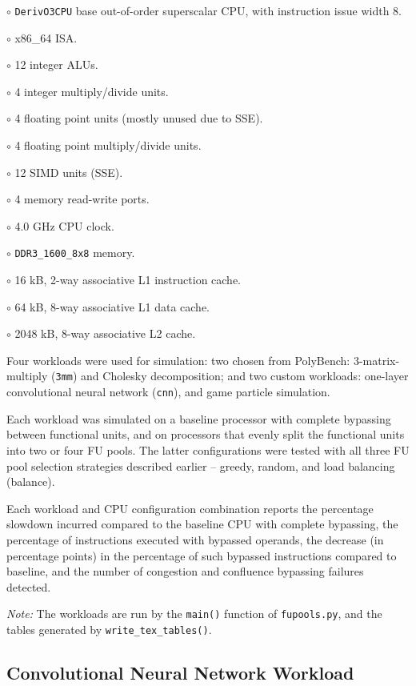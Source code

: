 \documentclass[11pt]{article}
\begin{document}
\( \circ \) \texttt{DerivO3CPU} base out-of-order superscalar CPU,
with instruction issue width 8.

\( \circ \) x86\_64 ISA.

\( \circ \) 12 integer ALUs.

\( \circ \) 4 integer multiply/divide units.

\( \circ \) 4 floating point units (mostly unused due to SSE).

\( \circ \) 4 floating point multiply/divide units.

\( \circ \) 12 SIMD units (SSE).

\( \circ \) 4 memory read-write ports.

\( \circ \) 4.0 GHz CPU clock.

\( \circ \) \texttt{DDR3\_1600\_8x8} memory.

\( \circ \) 16 kB, 2-way associative L1 instruction cache.

\( \circ \) 64 kB, 8-way associative L1 data cache.

\( \circ \) 2048 kB, 8-way associative L2 cache.

Four workloads were used for simulation: two chosen from PolyBench:
3-matrix-multiply (\texttt{3mm}) and Cholesky decomposition; and two
custom workloads: one-layer convolutional neural network
(\texttt{cnn}), and game particle simulation.

Each workload was simulated on a baseline processor with complete
bypassing between functional units, and on processors that evenly
split the functional units into two or four FU pools. The latter
configurations were tested with all three FU pool selection strategies
described earlier -- greedy, random, and load balancing (balance).

Each workload and CPU configuration combination reports the percentage
slowdown incurred compared to the baseline CPU with complete
bypassing, the percentage of instructions executed with bypassed
operands, the decrease (in percentage points) in the percentage of
such bypassed instructions compared to baseline, and the number of
congestion and confluence bypassing failures detected.

\textit{Note:} The workloads are run by the \texttt{main()} function
of \texttt{fupools.py}, and the tables generated by
\texttt{write\_tex\_tables()}.

\subsection{Convolutional Neural Network Workload}
\end{document}
